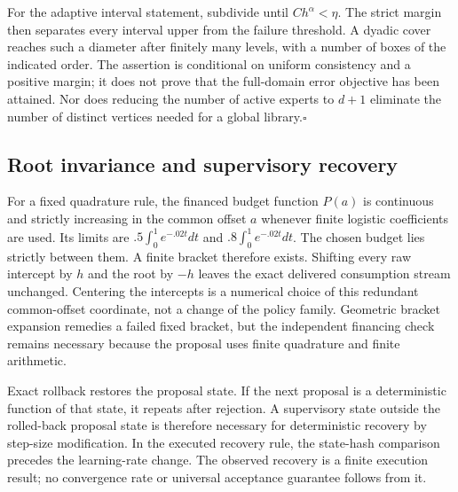 For the adaptive interval statement, subdivide until $Ch^\alpha<\eta$. The strict margin then separates every interval upper from the failure threshold. A dyadic cover reaches such a diameter after finitely many levels, with a number of boxes of the indicated order. The assertion is conditional on uniform consistency and a positive margin; it does not prove that the full-domain error objective has been attained. Nor does reducing the number of active experts to $d+1$ eliminate the number of distinct vertices needed for a global library.\hfill$\square$

\subsection{Root invariance and supervisory recovery}
For a fixed quadrature rule, the financed budget function $P(a)$ is continuous and strictly increasing in the common offset $a$ whenever finite logistic coefficients are used. Its limits are $.5\int_0^1e^{-.02t}dt$ and $.8\int_0^1e^{-.02t}dt$. The chosen budget lies strictly between them. A finite bracket therefore exists. Shifting every raw intercept by $h$ and the root by $-h$ leaves the exact delivered consumption stream unchanged. Centering the intercepts is a numerical choice of this redundant common-offset coordinate, not a change of the policy family. Geometric bracket expansion remedies a failed fixed bracket, but the independent financing check remains necessary because the proposal uses finite quadrature and finite arithmetic.

Exact rollback restores the proposal state. If the next proposal is a deterministic function of that state, it repeats after rejection. A supervisory state outside the rolled-back proposal state is therefore necessary for deterministic recovery by step-size modification. In the executed recovery rule, the state-hash comparison precedes the learning-rate change. The observed recovery is a finite execution result; no convergence rate or universal acceptance guarantee follows from it.
